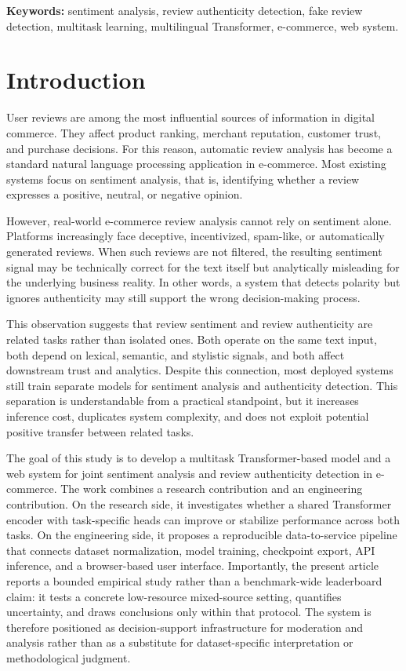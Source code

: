 \documentclass[12pt,a4paper]{article}
\begin{document}
\noindent\textbf{Keywords:} sentiment analysis, review authenticity detection, fake review detection, multitask learning, multilingual Transformer, e-commerce, web system.

\section{Introduction}

User reviews are among the most influential sources of information in digital commerce. They affect product ranking, merchant reputation, customer trust, and purchase decisions. For this reason, automatic review analysis has become a standard natural language processing application in e-commerce. Most existing systems focus on sentiment analysis, that is, identifying whether a review expresses a positive, neutral, or negative opinion.

However, real-world e-commerce review analysis cannot rely on sentiment alone. Platforms increasingly face deceptive, incentivized, spam-like, or automatically generated reviews. When such reviews are not filtered, the resulting sentiment signal may be technically correct for the text itself but analytically misleading for the underlying business reality. In other words, a system that detects polarity but ignores authenticity may still support the wrong decision-making process.

This observation suggests that review sentiment and review authenticity are related tasks rather than isolated ones. Both operate on the same text input, both depend on lexical, semantic, and stylistic signals, and both affect downstream trust and analytics. Despite this connection, most deployed systems still train separate models for sentiment analysis and authenticity detection. This separation is understandable from a practical standpoint, but it increases inference cost, duplicates system complexity, and does not exploit potential positive transfer between related tasks.

The goal of this study is to develop a multitask Transformer-based model and a web system for joint sentiment analysis and review authenticity detection in e-commerce. The work combines a research contribution and an engineering contribution. On the research side, it investigates whether a shared Transformer encoder with task-specific heads can improve or stabilize performance across both tasks. On the engineering side, it proposes a reproducible data-to-service pipeline that connects dataset normalization, model training, checkpoint export, API inference, and a browser-based user interface. Importantly, the present article reports a bounded empirical study rather than a benchmark-wide leaderboard claim: it tests a concrete low-resource mixed-source setting, quantifies uncertainty, and draws conclusions only within that protocol. The system is therefore positioned as decision-support infrastructure for moderation and analysis rather than as a substitute for dataset-specific interpretation or methodological judgment.
\end{document}
